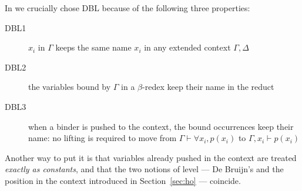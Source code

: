 \documentclass{llncs}
\begin{document}
In \elpi{} we crucially chose DBL because of the following three properties:
\begin{description}
\item[DBL1] $x_i$ in $\Gamma$ keeps the same name $x_i$ in any extended context $\Gamma, \Delta$
\item[DBL2] the variables bound by $\Gamma$ in a $\beta$-redex keep their name in the reduct
\item[DBL3] when a binder is pushed to the context, the bound occurrences keep
 their name: no lifting is required to move from $\Gamma \vdash \forall x_i, p(x_i)$ to $\Gamma, x_i \vdash p(x_i)$
\end{description}
Another way to put it is that variables already pushed in the context
are treated \emph{exactly as constants}, and that the two notions of level
--- De Bruijn's and the position in the context introduced in Section~\ref{sec:ho} --- coincide.

%
\end{document}
